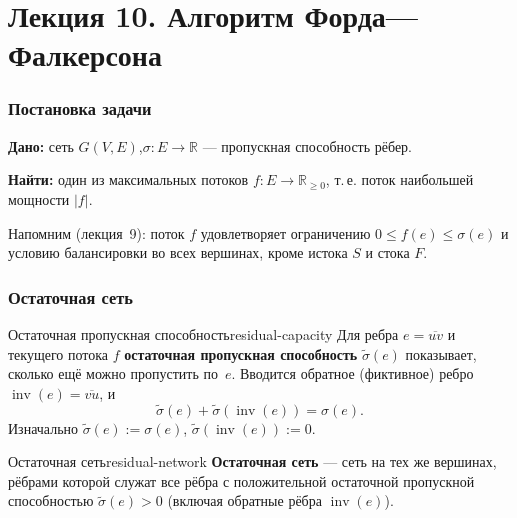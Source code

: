 
\chapter{Лекция 10. Алгоритм Форда—Фалкерсона}

\subsection*{Постановка задачи}

\textbf{Дано:} сеть $G(V, E)$,\quad $\sigma\colon E \to \mathbb{R}$ --- пропускная
способность рёбер.

\textbf{Найти:} один из максимальных потоков $f\colon E \to \mathbb{R}_{\geq 0}$,
т.\,е. поток наибольшей мощности $|f|$.

\medskip
\noindent
Напомним (лекция~9): поток $f$ удовлетворяет ограничению $0 \le f(e) \le \sigma(e)$
и условию балансировки во всех вершинах, кроме истока $S$ и стока $F$.

\subsection*{Остаточная сеть}

\begin{defn}{Остаточная пропускная способность}{residual-capacity}
Для ребра $e = \overline{uv}$ и текущего потока $f$ \textbf{остаточная пропускная
способность} $\tilde{\sigma}(e)$ показывает, сколько ещё можно пропустить по~$e$.
Вводится обратное (фиктивное) ребро $\operatorname{inv}(e) = \overline{vu}$, и
\[
  \tilde{\sigma}(e) + \tilde{\sigma}(\operatorname{inv}(e)) = \sigma(e).
\]
Изначально $\tilde{\sigma}(e) := \sigma(e)$, $\tilde{\sigma}(\operatorname{inv}(e)) := 0$.
\end{defn}

\begin{defn}{Остаточная сеть}{residual-network}
\textbf{Остаточная сеть} --- сеть на тех же вершинах, рёбрами которой служат все рёбра
с положительной остаточной пропускной способностью $\tilde{\sigma}(e) > 0$
(включая обратные рёбра $\operatorname{inv}(e)$).
\end{defn}

